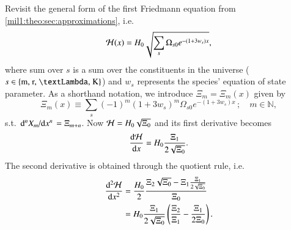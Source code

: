 




Revisit the general form of the first Friedmann equation from \cref{mil1:theo:sec:approximations}, i.e.
\begin{equation}\label{app:hubble_derivatives:eq:Hp_of_x}
    \mathcal{H}(x) = H_0 \sqrt{\sum_{s}\Omega_{s0}e^{-(1+3w_s)x}},
\end{equation}
where sum over $s$ is a sum over the constituents in the universe ($s\in\left\{\text{m, r, \textLambda, K} \right\}$) and $w_s$ represents the species' equation of state parameter. As a shorthand notation, we introduce $\Xi_m = \Xi_m(x)$ given by
\begin{equation}\label{app:hubble_derivatives:eq:Xi_of_x}
    \Xi_{m}(x)\equiv \sum_{s} (-1)^m(1+3w_s)^m \Omega_{s0}e^{-(1+3w_s)x} \,; \quad m\in\mathbb{N},
\end{equation}\label{app:hubble_derivatives:dHp_dx}
s.t. $\dv*[n]{X_m}{x} = \Xi_{m+n}$. Now $\mathcal{H} = H_0\sqrt{\Xi_0}$ and its first derivative becomes
\begin{equation}
    \dv{\mathcal{H}}{x} = H_0 \frac{\Xi_1}{2\sqrt{\Xi_0}}.
\end{equation}
The second derivative is obtained through the quotient rule, i.e.
\begin{equation}\label{app:hubble_derivatives:eq:ddHp_dxx}
    \begin{split}
    \dv[2]{\mathcal{H}}{x} &= \frac{H_0}{2} \frac{\Xi_2\sqrt{\Xi_0} - \Xi_1\frac{\Xi_1}{2\sqrt{\Xi_0}}}{\Xi_0} \\
    &= H_0\frac{\Xi_1} {2\sqrt{\Xi_0}}\left(  \frac{\Xi_2}{\Xi_1}- \frac{\Xi_1}{2\Xi_0} \right).
    \end{split}
\end{equation}



